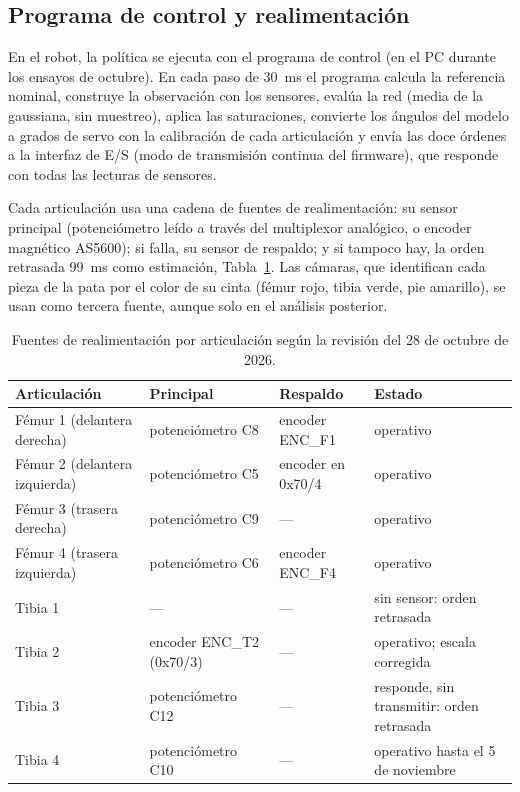 \subsection{Programa de control y realimentación}

En el robot, la política se ejecuta con el programa de control
 (en el PC durante los ensayos de octubre). En cada paso de 30~ms el programa calcula la
referencia nominal, construye la observación con los sensores, evalúa la red
(media de la gaussiana, sin muestreo), aplica las saturaciones, convierte los
ángulos del modelo a grados de servo con la calibración de cada articulación y
envía las doce órdenes a la interfaz de E/S (modo de transmisión continua del
firmware), que responde con todas las lecturas de sensores.

Cada articulación usa una cadena de fuentes de realimentación: su sensor
principal (potenciómetro leído a través del multiplexor analógico, o encoder
magnético AS5600); si falla, su sensor de respaldo; y si tampoco hay, la orden
retrasada 99~ms como estimación, Tabla~\ref{tab:sensores-articulaciones}. Las
cámaras, que identifican cada pieza de la pata por el color de su cinta (fémur
rojo, tibia verde, pie amarillo), se usan como tercera fuente, aunque solo en el
análisis posterior.

\begin{table}[H]
\centering
\caption{Fuentes de realimentación por articulación según la revisión del 28 de octubre de 2026.}
\label{tab:sensores-articulaciones}
\footnotesize
\begin{tabular}{llll}
\toprule
Articulación & Principal & Respaldo & Estado \\
\midrule
Fémur 1 (delantera derecha) & potenciómetro C8 & encoder ENC\_F1 & operativo \\
Fémur 2 (delantera izquierda) & potenciómetro C5 & encoder en 0x70/4 & operativo \\
Fémur 3 (trasera derecha) & potenciómetro C9 & --- & operativo \\
Fémur 4 (trasera izquierda) & potenciómetro C6 & encoder ENC\_F4 & operativo \\
Tibia 1 & --- & --- & sin sensor: orden retrasada \\
Tibia 2 & encoder ENC\_T2 (0x70/3) & --- & operativo; escala corregida \\
Tibia 3 & potenciómetro C12 & --- & responde, sin transmitir: orden retrasada \\
Tibia 4 & potenciómetro C10 & --- & operativo hasta el 5 de noviembre \\
\bottomrule
\end{tabular}
\end{table}

